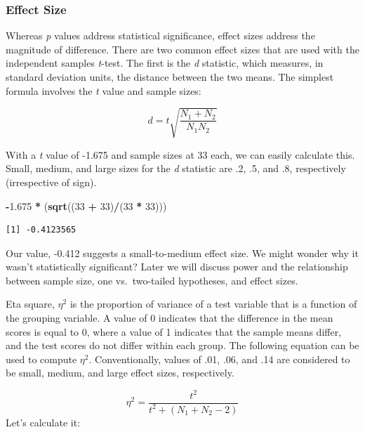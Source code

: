 \documentclass[
  11pt,
]{book}
\newenvironment{Shaded}{\begin{snugshade}}{\end{snugshade}}
\newcommand{\DecValTok}[1]{\textcolor[rgb]{0.06,0.06,0.06}{#1}}
\newcommand{\FloatTok}[1]{\textcolor[rgb]{0.06,0.06,0.06}{#1}}
\newcommand{\FunctionTok}[1]{\textcolor[rgb]{0.27,0.27,0.27}{\textbf{#1}}}
\newcommand{\NormalTok}[1]{#1}
\newcommand{\SpecialCharTok}[1]{\textcolor[rgb]{0.43,0.43,0.43}{\textbf{#1}}}
\begin{document}
\hypertarget{effect-size-1}{%
\subsubsection{Effect Size}\label{effect-size-1}}

Whereas \emph{p} values address statistical significance, effect sizes address the magnitude of difference. There are two common effect sizes that are used with the independent samples \emph{t}-test. The first is the \emph{d} statistic, which measures, in standard deviation units, the distance between the two means. The simplest formula involves the \emph{t} value and sample sizes:

\[d = t\sqrt{\frac{N_{1}+N_{2}}{N_{1}N_{2}}}\]

With a \emph{t} value of -1.675 and sample sizes at 33 each, we can easily calculate this. Small, medium, and large sizes for the \emph{d} statistic are .2, .5, and .8, respectively (irrespective of sign).

\begin{Shaded}
\begin{Highlighting}[]
\SpecialCharTok{{-}}\FloatTok{1.675} \SpecialCharTok{*}\NormalTok{ (}\FunctionTok{sqrt}\NormalTok{((}\DecValTok{33} \SpecialCharTok{+} \DecValTok{33}\NormalTok{)}\SpecialCharTok{/}\NormalTok{(}\DecValTok{33} \SpecialCharTok{*} \DecValTok{33}\NormalTok{)))}
\end{Highlighting}
\end{Shaded}

\begin{verbatim}
[1] -0.4123565
\end{verbatim}

Our value, -0.412 suggests a small-to-medium effect size. We might wonder why it wasn't statistically significant? Later we will discuss power and the relationship between sample size, one vs.~two-tailed hypotheses, and effect sizes.

Eta square, \(\eta^2\) is the proportion of variance of a test variable that is a function of the grouping variable. A value of 0 indicates that the difference in the mean scores is equal to 0, where a value of 1 indicates that the sample means differ, and the test scores do not differ within each group. The following equation can be used to compute \(\eta^2\). Conventionally, values of .01, .06, and .14 are considered to be small, medium, and large effect sizes, respectively.

\[\eta^{2} =\frac{t^{2}}{{t^{2}+(N_{1}+N_{2}-2)}}\] Let's calculate it:
\end{document}

